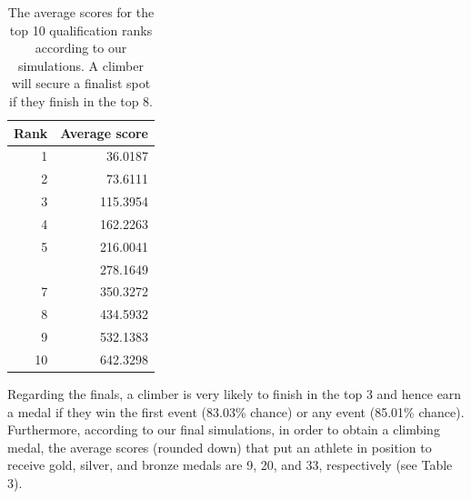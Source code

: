 \documentclass[12pt]{article}
\begin{document}
\begin{table}[H]

\caption{\label{tab:unnamed-chunk-8}The average scores for the top 10 qualification ranks according to our simulations. A climber will secure a finalist spot if they finish in the top 8.}
\centering
\begin{tabular}[t]{rr}
\toprule
Rank & Average score\\
\midrule
1 & 36.0187\\
2 & 73.6111\\
3 & 115.3954\\
4 & 162.2263\\
5 & 216.0041\\
\addlinespace
6 & 278.1649\\
7 & 350.3272\\
8 & 434.5932\\
9 & 532.1383\\
10 & 642.3298\\
\bottomrule
\end{tabular}
\end{table}

Regarding the finals, a climber is very likely to finish in the top 3
and hence earn a medal if they win the first event (83.03\% chance) or
any event (85.01\% chance). Furthermore, according to our final
simulations, in order to obtain a climbing medal, the average scores
(rounded down) that put an athlete in position to receive gold, silver,
and bronze medals are 9, 20, and 33, respectively (see Table 3).

\begin{table}[H]

\caption{\label{tab:unnamed-chunk-9}This table shows every possible final rank obtained from simulations for a climber given that a they win at least one discipline or finish first in the first discipline. For each rank, information on the number of times that climbers finish at the given rank, the probability of finishing at exactly the given rank, and the probability of finishing at or below the given rank are included.}
\centering
{}
\end{table}
\end{document}
